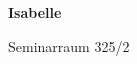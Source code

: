 \documentclass[a4paper]{article}
\begin{document}
\printGenericVSLHeader
\begin{center}
\begin{vsltext}{3cm}{4cm}

   \vspace{0.5cm} 

    \textbf{Isabelle} 

    \vspace{1.5cm}

    Seminarraum 325/2

\end{vsltext}

\end{center}
\end{document}

